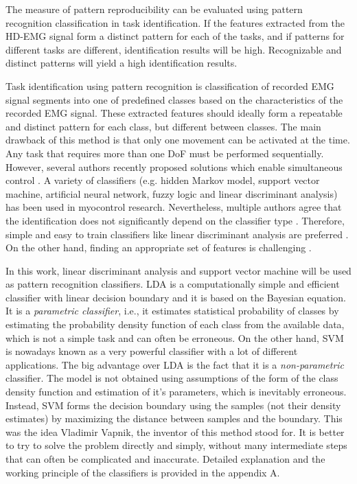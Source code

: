 The measure of pattern reproducibility can be evaluated using pattern recognition classification in task identification. If the features extracted from the HD-EMG signal form a distinct pattern for each of the tasks, and if patterns for different tasks are different, identification results will be high. Recognizable and distinct patterns will yield a high identification results.
   
Task identification using pattern recognition is classification of recorded EMG signal segments into one of predefined classes based on the characteristics of the recorded EMG signal. These extracted features should ideally form a repeatable and distinct pattern for each class, but different between classes.  The main drawback of this method is that only one movement can be activated at the time. Any task that requires more than one DoF must be performed sequentially. However, several authors recently proposed solutions which enable simultaneous control \citep{Young2013, Kamavuako2013, Baker2010}. A variety of classifiers (e.g. hidden Markov model, support vector machine, artificial neural network, fuzzy logic and linear discriminant analysis) \citep{Oskoei2007} has been used in myocontrol research. Nevertheless, multiple authors agree that the identification does not significantly depend on the classifier type \citep{Hargrove2007, Zhang2012, Hakonen2015}. Therefore, simple and easy to train classifiers like linear discriminant analysis are preferred \citep{Li2010, Englehart1999, Tkach2010, Li2014, Hakonen2015}. On the other hand, finding an appropriate set of features is challenging \citep{Englehart1999, Tkach2010, Liu2013}.

In this work, linear discriminant analysis and support vector machine will be used as pattern recognition classifiers. LDA is a computationally simple and efficient classifier with linear decision boundary and it is based on the Bayesian equation. It is a \emph{parametric classifier}, i.e., it estimates statistical probability of classes by estimating the probability density function of each class from the available data, which is not a simple task and can often be erroneous. On the other hand, SVM is nowadays known as a very powerful classifier with a lot of different applications. The big advantage over LDA is the fact that it is a \emph{non-parametric} classifier. The model is not obtained using assumptions of the form of the class density function and estimation of it's parameters, which is inevitably erroneous. Instead, SVM forms the decision boundary using the samples (not their density estimates) by maximizing the distance between samples and the boundary. This was the idea Vladimir Vapnik, the inventor of this method stood for. It is better to try to solve the problem directly and simply, without many intermediate steps that can often be complicated and inaccurate. Detailed explanation and the working principle of the classifiers is provided in the appendix A.

